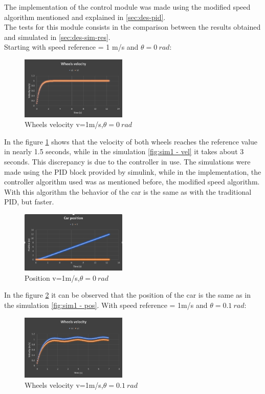 The implementation of the control module was made using the modified speed algorithm mentioned and explained in \ref{sec:des-pid}.\\
The tests for this module consists in the comparison between the results obtained and simulated in \ref{sec:des-sim-res}.\\
Starting with speed reference = 1 m/s and $\theta=0~\si{rad}$:
\begin{figure}[!h]
\centering
\includegraphics[width=0.45\textwidth]{./img/testv1t0.PNG}
\caption {\label{fig:test - vel0}Wheels velocity v=1m/s,$\theta = 0~\si{rad}$}
\end{figure}
In the figure \ref{fig:test - vel0} shows that the velocity of both wheels reaches the reference value in nearly 1.5 seconds, while in the simulation \ref{fig:sim1 - vel} it takes about 3 seconds. This discrepancy is due to the controller in use. The simulations  were made using the PID block provided by simulink, while in the implementation, the controller algorithm used was as mentioned before, the modified speed algorithm. With this algorithm the behavior of the car is the same as with the traditional PID, but faster.
\begin{figure}[!h]
\centering
\includegraphics[width=0.45\textwidth]{./img/testx1t0.PNG}
\caption {\label{fig:test - xy0}Position v=1m/s,$\theta = 0~\si{rad}$}
\end{figure}
In the figure \ref{fig:test - xy0} it can be observed that the position of the car is the same as in the simulation \ref{fig:sim1 - pos}.
\newline
With speed reference = 1m/s and $\theta = 0.1~\si{rad}$:
\begin{figure}[!h]
\centering
\includegraphics[width=0.45\textwidth]{./img/testv1t01.PNG}
\caption {\label{fig:test - vel01}Wheels velocity v=1m/s,$\theta = 0.1~\si{rad}$}
\end{figure}
